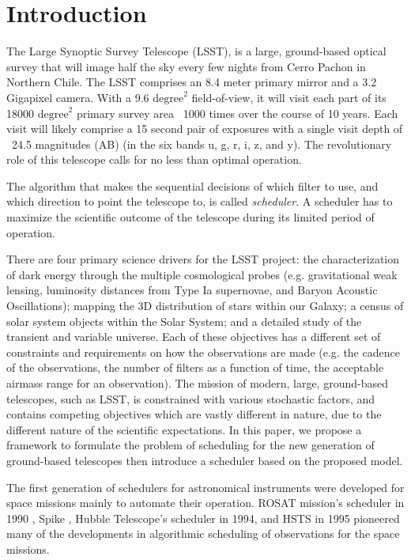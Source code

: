 \documentclass[12pt]{aastex62}
\theoremstyle{definition}
\begin{document}
\section{Introduction}
The Large Synoptic Survey Telescope (LSST), is a large,  ground-based optical survey that will image half the sky every few nights from Cerro Pachon in Northern Chile. The LSST comprises an 8.4 meter  primary mirror and a 3.2 Gigapixel camera.  With a 9.6 $\text{degree}^2$ field-of-view, it will visit each part of its 18000 $\text{degree}^2$ primary survey area ~1000 times over the course of 10 years. Each visit will likely comprise a 15 second pair of exposures with a single visit depth of ~24.5 magnitudes (AB) (in the six bands u, g, r, i, z, and y). The revolutionary role of this telescope calls for no less than optimal operation. 

The algorithm that makes the sequential decisions of which filter to use, and which direction to point the telescope to, is called \textit{scheduler}. A scheduler has to maximize the scientific outcome of the telescope during its limited period of operation. 

There are four primary science drivers for the LSST project: the characterization of dark energy through the multiple cosmological probes (e.g. gravitational weak lensing, luminosity distances from Type Ia supernovae, and Baryon Acoustic Oscillations); mapping the 3D distribution of stars within our Galaxy; a census of solar system objects within the Solar System; and a detailed study of the transient and variable universe. Each of these objectives has a different set of constraints and requirements on how the observations are made (e.g. the cadence of the observations, the number of filters as a function of time, the acceptable airmass range for an observation). The mission of modern, large, ground-based telescopes, such as LSST, is constrained with various stochastic factors, and contains competing objectives which are vastly different in nature, due to the different nature of the scientific expectations. In this paper, we propose a framework to formulate the problem of scheduling for the new generation of ground-based telescopes then introduce a scheduler based on the proposed model.

The first generation of schedulers for astronomical instruments were developed for space missions mainly to automate their operation. ROSAT mission's scheduler in 1990 \citep{nowakovski1999using},  Spike \citep{johnston1994spike}, Hubble Telescope's scheduler in 1994, and HSTS \citep{muscettola1995automating} in 1995 pioneered many of the developments in algorithmic scheduling of observations for the space missions.
\end{document}
